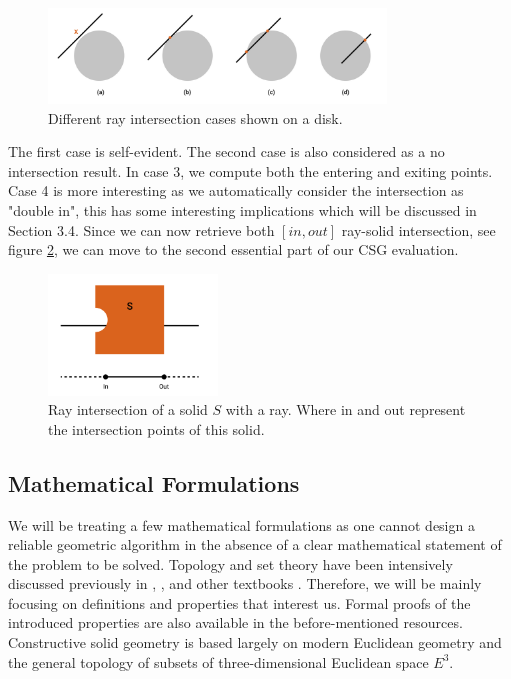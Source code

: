 \documentclass[a4paper,11pt,oneside]{article}
\begin{document}
\begin{figure}[ht]
	\begin{center}
		\includegraphics[width=0.8\textwidth]{section3/3.2/intersection_cases.png}
	\end{center}
	\caption{Different ray intersection cases shown on a disk.}
	\label{sec3.2:fig2}
\end{figure}


The first case is self-evident. The second case is also considered as a no intersection result. In case 3, we compute both the entering and exiting points. Case 4 is more interesting as we automatically consider the intersection as "double in", this has some interesting implications which will be discussed in Section 3.4. Since we can now retrieve both $[in, out]$ ray-solid intersection, see figure \ref{sec3.2:fig1}, we can move to the second essential part of our CSG evaluation.

\begin{figure}[ht]
	\begin{center}
		\includegraphics[width=0.4\textwidth]{section3/3.2/ray_intersection.png}
	\end{center}
	\caption{Ray intersection of a solid $S$ with a ray. Where in and out represent the intersection points of this solid.}
	\label{sec3.2:fig1}
\end{figure}

\subsection{Mathematical Formulations}
  
We will be treating a few mathematical formulations as one cannot design a reliable geometric algorithm in the absence of a clear mathematical statement of the problem to be solved. Topology and set theory have been intensively discussed previously in \cite{Requicha1978MathematicalFO}, \cite{tilove1977a}, and other textbooks \cite{lachlan_srebrny_zarach_1977}. Therefore, we will be mainly focusing on definitions and properties that interest us. Formal proofs of the introduced properties are also available in the before-mentioned resources. Constructive solid geometry is based largely on modern Euclidean geometry and the general topology of subsets of three-dimensional Euclidean space $E^3$.
  
\end{document}
